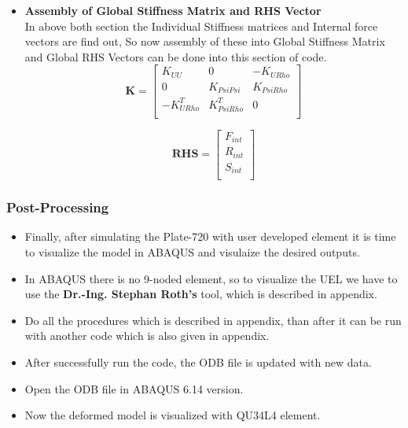 \documentclass[12pt]{article}
\begin{document}
\begin{itemize}
	\item \textbf{Assembly of Global Stiffness Matrix and RHS Vector} \\
	In above both section the Individual Stiffness matrices and Internal force vectors are find out, So now assembly of these into Global Stiffness Matrix and Global RHS Vectors can be done into this section of code. \\
	
	\begin{equation}\label{global_stiff}
	\textbf{K}=
	\begin{bmatrix}
	K_{UU}&0&-K_{URho} \\
	0&K_{PsiPsi}&K_{PsiRho}\\
	-K_{URho}^T&K_{PsiRho}^T&0\\
	\end{bmatrix}
	\end{equation}

	\begin{equation}\label{global_force}
	\textbf{RHS}=
	\begin{bmatrix}
	F_{int} \\
	R_{int} \\
	S_{int} \\
	\end{bmatrix}
	\end{equation}	
	
\end{itemize}



\subsubsection{ Post-Processing}
\begin{itemize}
	\item Finally, after simulating the Plate-720 with user developed element it is time to visualize the model in ABAQUS and visulaize the desired outputs. 
	\item In ABAQUS there is no 9-noded element, so to visualize the UEL we have to use the \textbf{Dr.-Ing. Stephan Roth's} tool, which is described in appendix.
	\item Do all the procedures which is described in appendix, than after it can be run with another code which is also given in appendix.
	\item After successfully run the code, the ODB file is updated with new data.
	\item Open the ODB file in ABAQUS 6.14 version.
	\item Now the deformed model is visualized with QU34L4 element.
\end{itemize}
\end{document}
